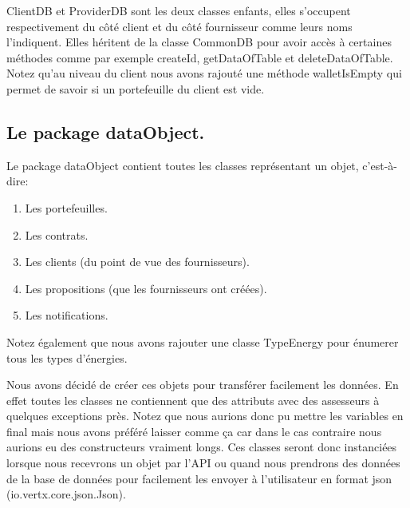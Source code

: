 \begin{flushleft}
ClientDB et ProviderDB sont les deux classes enfants, elles s'occupent respectivement du côté client et du côté fournisseur comme leurs noms l'indiquent. Elles héritent de la classe CommonDB pour avoir accès à certaines méthodes comme par exemple createId, getDataOfTable et deleteDataOfTable. Notez qu'au niveau du client nous avons rajouté une méthode walletIsEmpty qui permet de savoir si un portefeuille du client est vide.
\end{flushleft}

\subsection{Le package dataObject.}

\begin{flushleft}
Le package dataObject contient toutes les classes représentant un objet, c'est-à-dire:
\end{flushleft}

\begin{enumerate}[-]
\item Les portefeuilles.
\item Les contrats.
\item Les clients (du point de vue des fournisseurs).
\item Les propositions (que les fournisseurs ont créées).
\item Les notifications.
\end{enumerate}

\begin{flushleft}
Notez également que nous avons rajouter une classe TypeEnergy pour énumerer tous les types d'énergies.
\end{flushleft}

\begin{flushleft}
Nous avons décidé de créer ces objets pour transférer facilement les données. En effet toutes les classes ne contiennent que des attributs avec des assesseurs à quelques exceptions près. Notez que nous aurions donc pu mettre les variables en final mais nous avons préféré laisser comme ça car dans le cas contraire nous aurions eu des constructeurs vraiment longs. Ces classes seront donc instanciées lorsque nous recevrons un objet par l'API ou quand nous prendrons des données de la base de données pour facilement les envoyer à l'utilisateur en format json (io.vertx.core.json.Json).
\end{flushleft}

